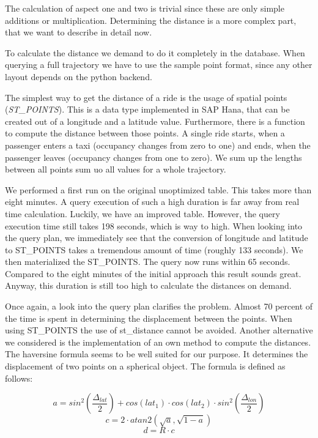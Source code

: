 \documentclass[10pt]{sig-alternate}
\begin{document}
The calculation of aspect one and two is trivial since these are only simple additions or multiplication. Determining the distance is a more complex part, that we want to describe in detail now.

To calculate the distance we demand to do it completely in the database. When querying a full trajectory we have to use the sample point format, since any other layout depends on the python backend.

The simplest way to get the distance of a ride is the usage of spatial points (\textit{ST\_POINTS}). This is a data type implemented in SAP Hana, that can be created out of a longitude and a latitude value. Furthermore, there is a function to compute the distance between those points. A single ride starts, when a passenger enters a taxi (occupancy changes from zero to one) and ends, when the passenger leaves (occupancy changes from one to zero). We sum up the lengths between all points sum uo all values for a whole trajectory.

We performed a first run on the original unoptimized table. This takes more than eight minutes. A query execution of such a high duration is far away from real time calculation. Luckily, we have an improved table. However, the query execution time still takes 198 seconds, which is way to high. When looking into the query plan, we immediately see that the conversion of longitude and latitude to ST\_POINTS takes a tremendous amount of time (roughly 133 seconds). We then materialized the ST\_POINTS. The query now runs within 65 seconds. Compared to the eight minutes of the initial approach this result sounds great. Anyway, this duration is still too high to calculate the distances on demand.

Once again, a look into the query plan clarifies the problem. Almost 70 percent of the time is spent in determining the displacement between the points. When using ST\_POINTS the use of st\_distance cannot be avoided. Another alternative we considered is the implementation of an own method to compute the distances. The haversine formula seems to be well suited for our purpose. It determines the displacement of two points on a spherical object. The formula is defined as follows:

\begin{equation} a = sin^2(\frac{\Delta_{lat}}{2}) + cos(lat_1) \cdot cos(lat_2) \cdot sin^2(\frac{\Delta_{lon}}{2}) \end{equation}
\begin{equation} c = 2 \cdot atan2(\sqrt{a}, \sqrt{1 - a}) \end{equation}
\begin{equation} d = R \cdot c \end{equation}
\end{document}
